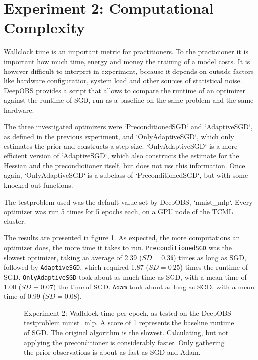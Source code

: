 \documentclass[twoside,12pt,a4paper]{report}
\begin{document}
\section{Experiment 2: Computational Complexity}
\begin{markdown}
Wallclock time is an important metric for practitioners. To the practicioner it is important how much time, energy and money the training of a model costs. It is however difficult to interpret in experiment, because it depends on outside factors like hardware configuration, system load and other sources of statistical noise. DeepOBS provides a script that allows to compare the runtime of an optimizer against the runtime of SGD, run as a baseline on the same problem and the same hardware.

The three investigated optimizers were `PreconditionedSGD` and `AdaptiveSGD`, as defined in the previous experiment, and `OnlyAdaptiveSGD`, which only estimates the prior and constructs a step size. `OnlyAdaptiveSGD` is a more efficient version of `AdaptiveSGD`, which also constructs the estimate for the Hessian and the precondiotioner itself, but does not use this information. Once again, `OnlyAdaptiveSGD` is a subclass of `PreconditionedSGD`, but with some knocked-out functions.

The testproblem used was the default value set by DeepOBS, `mnist_mlp`. Every optimizer was run 5 times for 5 epochs each, on a GPU node of the TCML cluster.
\end{markdown}

The results are presented in figure \ref{fig:exp_perf_prec}. As expected, the more computations an optimizer does, the more time it takes to run.
\verb|PreconditionedSGD| was the slowest optimizer, taking an average of 2.39 ($SD = 0.36$) times as long as SGD, followed by \verb|AdaptiveSGD|, which required 1.87 ($SD = 0.25$) times the runtime of SGD. \verb|OnlyAdaptiveSGD| took about as much time as SGD, with a mean time of 1.00 ($SD = 0.07$) the time of SGD. \verb|Adam| took about as long as SGD, with a mean time of 0.99 ($SD = 0.08$).


\begin{figure}
	\centering \hspace{-1,5cm}
	
	\caption{Experiment 2: Wallclock time per epoch, as tested on the DeepOBS testproblem mnist\_mlp. A score of 1 represents the baseline runtime of SGD. The original algorithm is the slowest. Calculating, but not applying the preconditioner is considerably faster. Only gathering the prior observations is about as fast as SGD and Adam.}
	\label{fig:exp_perf_prec}
	
\end{figure}
\end{document}
